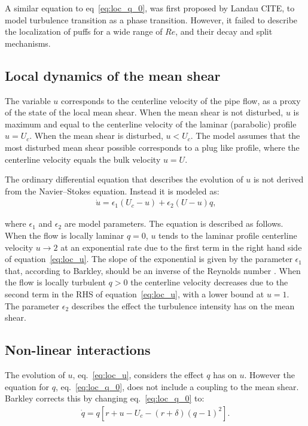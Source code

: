 \documentclass{article}
\begin{document}
A similar equation to eq~\ref{eq:loc_q_0}, was first proposed by Landau CITE, to model turbulence transition as a phase transition. However, it failed to describe the localization of puffs for a wide range of $Re$, and their decay and split mechanisms. 






\subsection{Local dynamics of the mean shear}
The variable $u$ corresponds to the centerline velocity of the pipe flow, as a proxy of the state of the local mean shear. When the mean shear is not disturbed, $u$ is maximum and equal to the centerline velocity of the laminar (parabolic) profile $u=U_{c}$. When the mean shear is disturbed, $u<U_{c}$. The model assumes that the most disturbed mean shear possible corresponds to a plug like profile, where the centerline velocity equals the bulk velocity $u=U$. 

The ordinary differential equation that describes the evolution of $u$ is not derived from the Navier--Stokes equation. Instead it is modeled as:
\begin{align}
\dot{u}= \epsilon_{1} \left(U_{c}-u \right) + \epsilon_{2} \left(U-u \right)q \text{,}
\label{eq:loc_u}
\end{align}

where $\epsilon_{1}$ and $\epsilon_{2}$ are model parameters. The equation is described as follows. When the flow is locally laminar $q=0$, $u$ tends to the laminar profile centerline velocity $u \rightarrow 2$ at an exponential rate due to the first term in the right hand side of equation~\ref{eq:loc_u}. The slope of the exponential is given by the parameter $\epsilon_{1}$ that, according to Barkley, should be an inverse of the Reynolds number \cite{barkley2016}. When the flow is locally turbulent $q>0$ the centerline velocity decreases due to the second term in the RHS of equation~\ref{eq:loc_u}, with a lower bound at $u=1$. The parameter $\epsilon_{2}$ describes the effect the turbulence intensity has on the mean shear. 





\subsection{Non-linear interactions}
The evolution of $u$, eq.~\ref{eq:loc_u}, considers the effect $q$ has on $u$. However the equation for $q$, eq.~\ref{eq:loc_q_0}, does not include a coupling to the mean shear. Barkley corrects this by changing eq.~\ref{eq:loc_q_0} to: 
\begin{align}
\dot{q}=q \left[r+u-U_{c}-\left(r+\delta \right) \left(q -1 \right)^{2} \right]\text{.}
\label{eq:loc_q}
\end{align}
\end{document}
